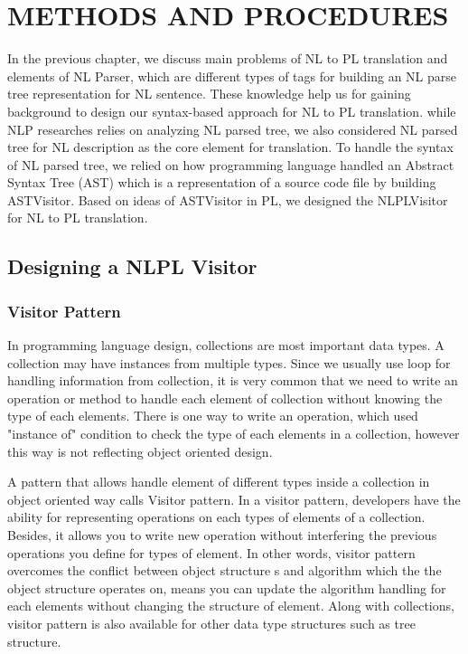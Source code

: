 \chapter{METHODS AND PROCEDURES}
In the previous chapter, we discuss main problems of NL to PL translation and elements of NL Parser, which are different types of tags for building an NL parse tree representation for NL sentence. These knowledge help us for gaining background to design our syntax-based approach for NL to PL translation. while NLP researches relies on analyzing NL parsed tree, we also considered NL parsed tree for NL description as the core element for translation. To handle the syntax of NL parsed tree, we relied on how programming language handled an Abstract Syntax Tree (AST) which is a representation of a source code file by building ASTVisitor. Based on ideas of ASTVisitor in PL, we designed the NLPLVisitor for NL to PL translation.  
\section{Designing a NLPL Visitor}
\subsection{Visitor Pattern}
In programming language design, collections are most important data types. A collection may have instances from multiple types. Since we usually use loop for handling information from collection, it is very common that we need to write an operation or method to handle each element of collection without knowing the type of each elements. There is one way to write an operation, which used "instance of" condition to check the type of each elements in a collection, however this way is not reflecting object oriented design. 

A pattern that allows handle element of different types inside a collection in object oriented way calls Visitor pattern. In a visitor pattern, developers have the ability for representing operations on each types of elements of a collection. Besides, it allows you to write new operation without interfering the previous operations you define for types of element. In other words, visitor pattern overcomes the conflict between object structure s and algorithm  which the the object structure operates on, means you can update the algorithm handling for each elements without changing the structure of element. Along with collections, visitor pattern is also available for other data type structures such as tree structure.


